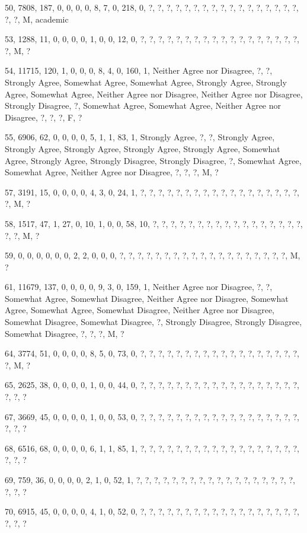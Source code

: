 \documentclass[12pt,twoside]{article}
\begin{document}
50, 7808, 187, 0, 0, 0, 0, 8, 7, 0, 218, 0, ?, ?, ?, ?, ?, ?, ?, ?, ?,
?, ?, ?, ?, ?, ?, ?, ?, ?, ?, M, academic

53, 1288, 11, 0, 0, 0, 0, 1, 0, 0, 12, 0, ?, ?, ?, ?, ?, ?, ?, ?, ?, ?,
?, ?, ?, ?, ?, ?, ?, ?, ?, M, ?

54, 11715, 120, 1, 0, 0, 0, 8, 4, 0, 160, 1, Neither Agree nor Disagree,
?, ?, Strongly Agree, Somewhat Agree, Somewhat Agree, Strongly Agree,
Strongly Agree, Somewhat Agree, Neither Agree nor Disagree, Neither
Agree nor Disagree, Strongly Disagree, ?, Somewhat Agree, Somewhat
Agree, Neither Agree nor Disagree, ?, ?, ?, F, ?

55, 6906, 62, 0, 0, 0, 0, 5, 1, 1, 83, 1, Strongly Agree, ?, ?, Strongly
Agree, Strongly Agree, Strongly Agree, Strongly Agree, Strongly Agree,
Somewhat Agree, Strongly Agree, Strongly Disagree, Strongly Disagree,
?, Somewhat Agree, Somewhat Agree, Neither Agree nor Disagree, ?, ?, ?,
M, ?

57, 3191, 15, 0, 0, 0, 0, 4, 3, 0, 24, 1, ?, ?, ?, ?, ?, ?, ?, ?, ?, ?,
?, ?, ?, ?, ?, ?, ?, ?, ?, M, ?

58, 1517, 47, 1, 27, 0, 10, 1, 0, 0, 58, 10, ?, ?, ?, ?, ?, ?, ?, ?, ?,
?, ?, ?, ?, ?, ?, ?, ?, ?, ?, M, ?

59, 0, 0, 0, 0, 0, 0, 2, 2, 0, 0, 0, ?, ?, ?, ?, ?, ?, ?, ?, ?, ?, ?, ?,
?, ?, ?, ?, ?, ?, ?, M, ?

61, 11679, 137, 0, 0, 0, 0, 9, 3, 0, 159, 1, Neither Agree nor Disagree,
?, ?, Somewhat Agree, Somewhat Disagree, Neither Agree nor Disagree,
Somewhat Agree, Somewhat Agree, Somewhat Disagree, Neither Agree nor
Disagree, Somewhat Disagree, Somewhat Disagree, ?, Strongly Disagree,
Strongly Disagree, Somewhat Disagree, ?, ?, ?, M, ?

64, 3774, 51, 0, 0, 0, 0, 8, 5, 0, 73, 0, ?, ?, ?, ?, ?, ?, ?, ?, ?, ?,
?, ?, ?, ?, ?, ?, ?, ?, ?, M, ?

65, 2625, 38, 0, 0, 0, 0, 1, 0, 0, 44, 0, ?, ?, ?, ?, ?, ?, ?, ?, ?, ?,
?, ?, ?, ?, ?, ?, ?, ?, ?, ?, ?

67, 3669, 45, 0, 0, 0, 0, 1, 0, 0, 53, 0, ?, ?, ?, ?, ?, ?, ?, ?, ?, ?,
?, ?, ?, ?, ?, ?, ?, ?, ?, ?, ?

68, 6516, 68, 0, 0, 0, 0, 6, 1, 1, 85, 1, ?, ?, ?, ?, ?, ?, ?, ?, ?, ?,
?, ?, ?, ?, ?, ?, ?, ?, ?, ?, ?

69, 759, 36, 0, 0, 0, 0, 2, 1, 0, 52, 1, ?, ?, ?, ?, ?, ?, ?, ?, ?, ?,
?, ?, ?, ?, ?, ?, ?, ?, ?, ?, ?

70, 6915, 45, 0, 0, 0, 0, 4, 1, 0, 52, 0, ?, ?, ?, ?, ?, ?, ?, ?, ?, ?,
?, ?, ?, ?, ?, ?, ?, ?, ?, ?, ?
\end{document}
